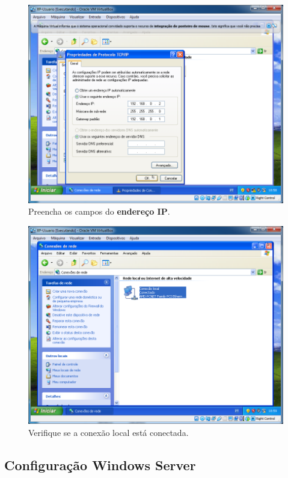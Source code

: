 \documentclass[10pt]{article}
\begin{document}
\begin{figure}[H]
    \centering
    \caption{Preencha os campos do \textbf{endereço IP}.}
    \label{fig:4134}
    \includegraphics[width=\linewidth]{images/xp_rede/016.png}
\end{figure}

\begin{figure}[H]
    \centering
    \caption{Verifique se a conexão local está conectada.}
    \label{fig:4135}
    \includegraphics[width=\linewidth]{images/xp_rede/018.png}
\end{figure}


\subsection{Configuração Windows Server}
\end{document}
